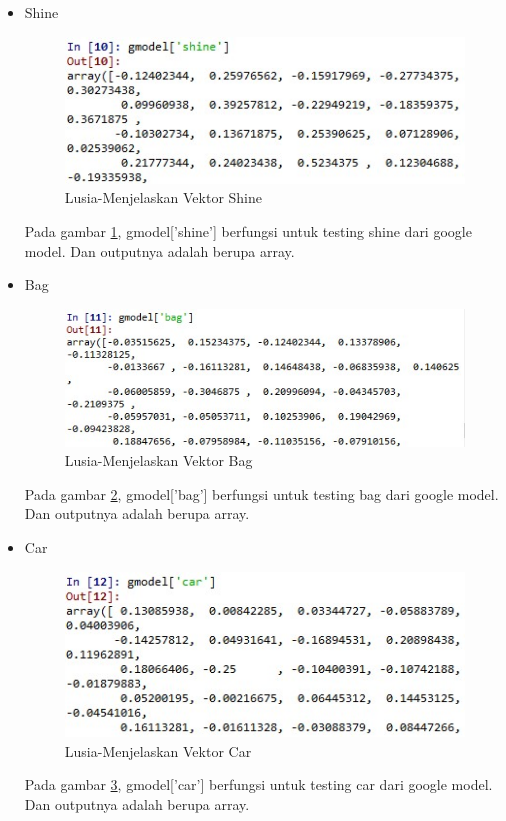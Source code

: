 \begin{enumerate}
\begin{enumerate}
\begin{itemize}
				\item Shine
					\begin{figure}[!hbtp]
					\centering
					\includegraphics[scale=0.4]{figures/chap5f.jpg}
					\caption{Lusia-Menjelaskan Vektor Shine}
					\label{5b7}
					\end{figure}
					\par Pada gambar \ref{5b7}, gmodel['shine'] berfungsi untuk testing shine dari google model. Dan outputnya adalah berupa array. 
					
				\item Bag
					\begin{figure}[!hbtp]
					\centering
					\includegraphics[scale=0.45]{figures/chap5g.jpg}
					\caption{Lusia-Menjelaskan Vektor Bag}
					\label{5b8}
					\end{figure}
					\par Pada gambar \ref{5b8}, gmodel['bag'] berfungsi untuk testing bag dari google model. Dan outputnya adalah berupa array. 
					
				\item Car
					\begin{figure}[!hbtp]
					\centering
					\includegraphics[scale=0.45]{figures/chap5h.jpg}
					\caption{Lusia-Menjelaskan Vektor Car}
					\label{5b9}
					\end{figure}
					\par Pada gambar \ref{5b9}, gmodel['car'] berfungsi untuk testing car dari google model. Dan outputnya adalah berupa array. 
					

\end{itemize}
\end{enumerate}
\end{enumerate}
